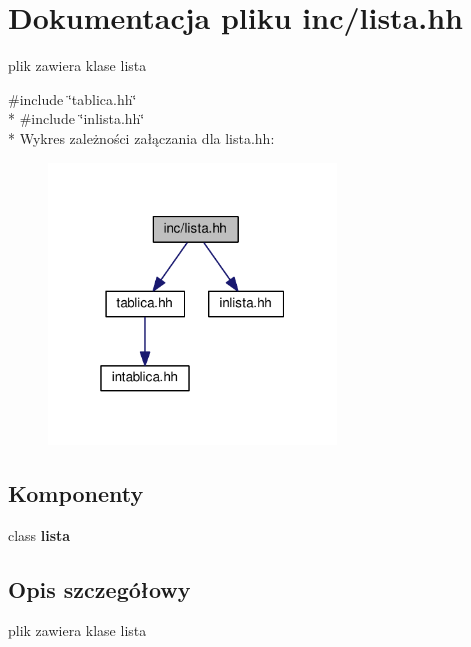 \section{Dokumentacja pliku inc/lista.hh}
\label{lista_8hh}


plik zawiera klase lista  


{\ttfamily \#include \char`\"{}tablica.\+hh\char`\"{}}\\*
{\ttfamily \#include \char`\"{}inlista.\+hh\char`\"{}}\\*
Wykres zależności załączania dla lista.\+hh\+:
\nopagebreak
\begin{figure}[H]
\begin{center}
\leavevmode
\includegraphics[width=217pt]{lista_8hh__incl}
\end{center}
\end{figure}
\subsection*{Komponenty}
\begin{DoxyCompactItemize}
\item 
class {\bf lista}
\end{DoxyCompactItemize}


\subsection{Opis szczegółowy}
plik zawiera klase lista 

